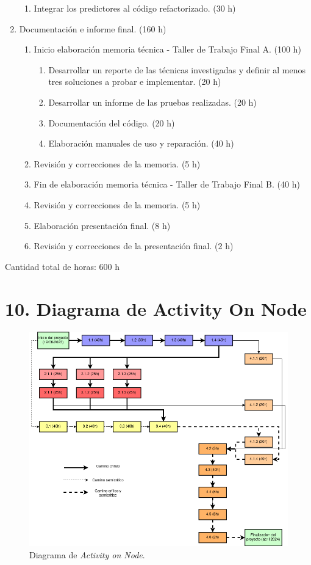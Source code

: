 \documentclass[
11pt, %
]{charter}
\begin{document}
\begin{enumerate}
\begin{enumerate}
			\item Integrar los predictores al código refactorizado. (30 h)
		\end{enumerate}
\item Documentación e informe final. (160 h)
\begin{enumerate}
	\item Inicio elaboración memoria técnica - Taller de Trabajo Final A. (100 h)
		\begin{enumerate}
			\item Desarrollar un reporte de las técnicas investigadas y definir al menos tres soluciones a probar e implementar. (20 h)
			\item Desarrollar un informe de las pruebas realizadas. (20 h)
			\item Documentación del código. (20 h)
			\item Elaboración manuales de uso y reparación. (40 h)
		\end{enumerate}
	\item Revisión y correcciones de la memoria. (5 h)
	\item Fin de elaboración memoria técnica - Taller de Trabajo Final B. (40 h)
	\item Revisión y correcciones de la memoria. (5 h)
	\item Elaboración presentación final. (8 h)
	\item Revisión y correcciones de la presentación final. (2 h)
	\end{enumerate}
\end{enumerate}

Cantidad total de horas: 600 h

\section{10. Diagrama de Activity On Node}
\label{sec:AoN}


\begin{figure}[htpb]
\centering 
\includegraphics[width=.8\textwidth]{./aon.drawio.png}
\caption{Diagrama de \textit{Activity on Node}.}
\label{fig:AoN}
\end{figure}
\end{document}
